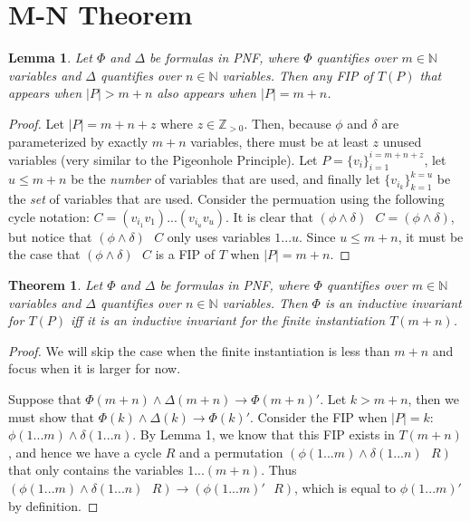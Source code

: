 \documentclass[12pt]{article}
\newtheorem{lemma}{Lemma}
\newtheorem{theorem}{Theorem}
\newcommand{\msp}{\text{ }}
\begin{document}
\section{M-N Theorem}

\begin{lemma}
  Let $\Phi$ and $\Delta$ be formulas in PNF, where $\Phi$ quantifies over $m \in \mathbb{N}$ variables and $\Delta$ quantifies over $n \in \mathbb{N}$ variables.  Then any FIP of $T(P)$ that appears when $|P| > m+n$ also appears when $|P| = m+n$.
\end{lemma}
\begin{proof}
  Let $|P| = m + n + z$ where $z \in \mathbb{Z}_{>0}$.  Then, because $\phi$ and $\delta$ are parameterized by exactly $m+n$ variables, there must be at least $z$ unused variables (very similar to the Pigeonhole Principle).  Let $P = \{v_i\}_{i=1}^{i=m+n+z}$, let $u \leq m+n$ be the \textit{number} of variables that are used, and finally let $\{v_{i_k}\}_{k=1}^{k=u}$ be the \textit{set} of variables that are used.  Consider the permuation using the following cycle notation: $C = (v_{i_1} v_1)...(v_{i_u} v_u)$.  It is clear that $(\phi \land \delta) \msp C = (\phi \land \delta)$, but notice that $(\phi \land \delta) \msp C$ only uses variables $1 ... u$.  Since $u \leq m+n$, it must be the case that $(\phi \land \delta) \msp C$ is a FIP of $T$ when $|P| = m+n$.
\end{proof}

\begin{theorem}
  Let $\Phi$ and $\Delta$ be formulas in PNF, where $\Phi$ quantifies over $m \in \mathbb{N}$ variables and $\Delta$ quantifies over $n \in \mathbb{N}$ variables.  Then $\Phi$ is an inductive invariant for $T(P)$ iff it is an inductive invariant for the finite instantiation $T(m+n)$.
\end{theorem}
\begin{proof}
  We will skip the case when the finite instantiation is less than $m+n$ and focus when it is larger for now.  

  Suppose that $\Phi(m+n) \land \Delta(m+n) \rightarrow \Phi(m+n)'$.  Let $k > m+n$, then we must show that $\Phi(k) \land \Delta(k) \rightarrow \Phi(k)'$.  Consider the FIP when $|P|=k$: $\phi(1 ... m) \land \delta(1 ... n)$.  By Lemma 1, we know that this FIP exists in $T(m+n)$, and hence we have a cycle $R$ and a permutation $(\phi(1 ... m) \land \delta(1 ... n) \msp R)$ that only contains the variables $1 ... (m+n)$.  Thus $(\phi(1 ... m) \land \delta(1 ... n) \msp R) \rightarrow (\phi(1 ... m)' \msp R)$, which is equal to $\phi(1 ... m)'$ by definition.
\end{proof}
\end{document}

